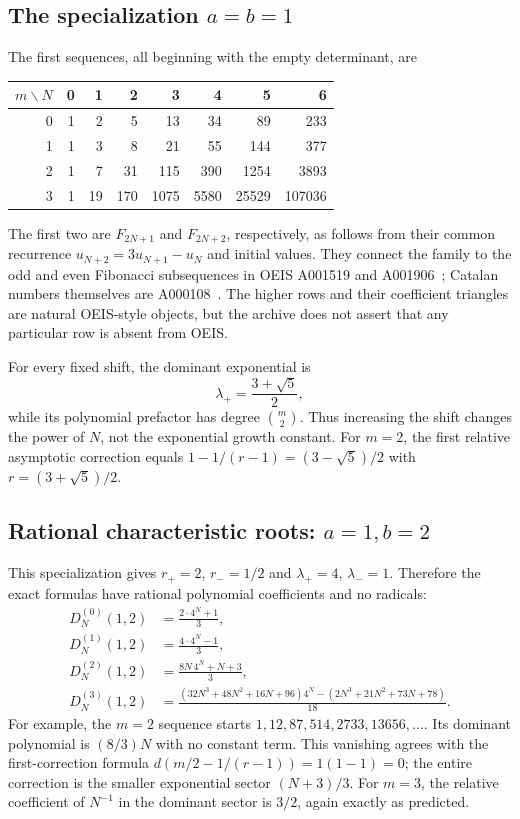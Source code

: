 \documentclass[11pt,a4paper]{article}
\numberwithin{equation}{section}
\theoremstyle{definition}
\theoremstyle{remark}
\newcommand{\D}[2]{D_{#1}^{(#2)}}
\begin{document}
\subsection{The specialization \texorpdfstring{$a=b=1$}{a=b=1}}
The first sequences, all beginning with the empty determinant, are
\begin{center}
\renewcommand{\arraystretch}{1.2}
\begin{tabular}{@{}r rrrrrrr@{}}
\toprule
$m\backslash N$ & 0 & 1 & 2 & 3 & 4 & 5 & 6\\
\midrule
0 & 1 & 2 & 5 & 13 & 34 & 89 & 233\\
1 & 1 & 3 & 8 & 21 & 55 & 144 & 377\\
2 & 1 & 7 & 31 & 115 & 390 & 1254 & 3893\\
3 & 1 & 19 & 170 & 1075 & 5580 & 25529 & 107036\\
\bottomrule
\end{tabular}
\end{center}
The first two are $F_{2N+1}$ and $F_{2N+2}$, respectively, as follows
from their common recurrence $u_{N+2}=3u_{N+1}-u_N$ and initial values.
They connect the family to the odd and even Fibonacci subsequences in
OEIS A001519 and A001906~\cite{OEISfib}; Catalan numbers themselves are
A000108~\cite{OEIScat}.  The higher rows and their coefficient triangles
are natural OEIS-style objects, but the archive does not assert that
any particular row is absent from OEIS.

For every fixed shift, the dominant exponential is
\[
 \lambda_+=\frac{3+\sqrt5}{2},
\]
while its polynomial prefactor has degree $\binom m2$.  Thus increasing
the shift changes the power of $N$, not the exponential growth constant.
For $m=2$, the first relative asymptotic correction equals
$1-1/(r-1)=(3-\sqrt5)/2$ with $r=(3+\sqrt5)/2$.

\subsection{Rational characteristic roots: \texorpdfstring{$a=1,b=2$}{a=1,b=2}}
This specialization gives $r_+=2$, $r_-=1/2$ and
$\lambda_+=4$, $\lambda_-=1$.  Therefore the exact formulas have
rational polynomial coefficients and no radicals:
\begin{align}
 \D{N}{0}(1,2)&=\frac{2\cdot4^N+1}{3},\label{eq:example0}\\
 \D{N}{1}(1,2)&=\frac{4\cdot4^N-1}{3},\label{eq:example1}\\
 \D{N}{2}(1,2)&=\frac{8N\,4^N+N+3}{3},\label{eq:example2}\\
 \D{N}{3}(1,2)&=
 \frac{(32N^3+48N^2+16N+96)4^N
       -(2N^3+21N^2+73N+78)}{18}.
 \label{eq:example3}
\end{align}
For example, the $m=2$ sequence starts
$1,12,87,514,2733,13656,\ldots$.  Its dominant polynomial is
$(8/3)N$ with no constant term.  This vanishing agrees with the
first-correction formula $d(m/2-1/(r-1))=1(1-1)=0$; the entire
correction is the smaller exponential sector $(N+3)/3$.
For $m=3$, the relative coefficient of $N^{-1}$ in the dominant sector
is $3/2$, again exactly as predicted.
\end{document}
